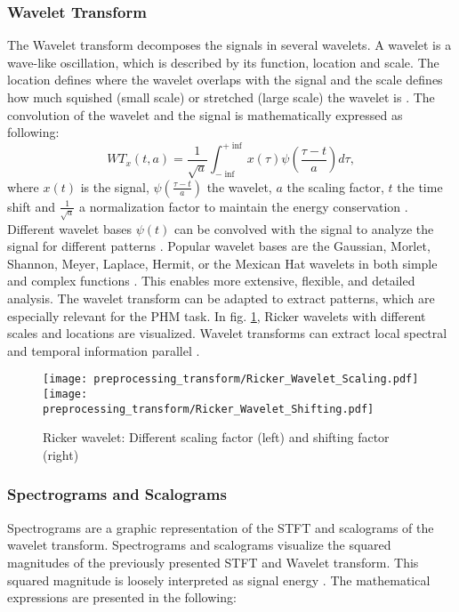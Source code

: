 \subsubsection{Wavelet Transform}
The Wavelet transform decomposes the signals in several wavelets. A wavelet is a wave-like oscillation, which is described by its function, location and scale. The location defines where the wavelet overlaps with the signal and the scale defines how much squished (small scale) or stretched (large scale) the wavelet is \cite{Sifuzzaman2009}. The convolution of the wavelet and the signal is mathematically expressed as following:
\begin{equation}
    WT_{x}(t,a) = \frac{1}{\sqrt{a}} \int_{- \inf}^{+ \inf} x(\tau) \psi(\frac{\tau -t}{a}) d \tau,
\end{equation}
 where $x(t)$ is the signal, $\psi(\frac{\tau -t}{a})$ the wavelet, $a$ the scaling factor, $t$ the time shift and $\frac{1}{\sqrt{a}}$ a normalization factor to maintain the energy conservation \cite{FENG2013}. Different wavelet bases $\psi(t)$ can be convolved with the signal to analyze the signal for different patterns \cite{Sifuzzaman2009}. Popular wavelet bases are the Gaussian, Morlet, Shannon, Meyer, Laplace, Hermit, or the Mexican Hat wavelets in both simple and complex functions \cite{Verstraete2017}. This enables more extensive, flexible, and detailed analysis. The wavelet transform can be adapted to extract patterns, which are especially relevant for the PHM task. In fig. \ref{fig:ricker_wavelet}, Ricker wavelets with different scales and locations are visualized. Wavelet transforms can extract local spectral and temporal information parallel \cite{Sifuzzaman2009}.


\begin{figure}[H]
  \centering
  \texttt{[image: preprocessing\_transform/Ricker\_Wavelet\_Scaling.pdf]}
  \hspace{.1cm}
  \texttt{[image: preprocessing\_transform/Ricker\_Wavelet\_Shifting.pdf]}
  

  \caption{Ricker wavelet: Different scaling factor (left) and shifting factor (right)}
  \label{fig:ricker_wavelet}
\end{figure}

\subsubsection{Spectrograms and Scalograms}

 Spectrograms are a graphic representation of the STFT and scalograms of the wavelet transform. Spectrograms and scalograms visualize the squared magnitudes of the previously presented STFT and Wavelet transform. This squared magnitude is loosely interpreted as signal energy \cite{Hlawatsch1992}. The mathematical expressions are presented in the following: 

